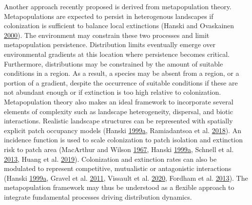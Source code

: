 \documentclass[12pt]{article}
\begin{document}
Another approach recently proposed is derived from metapopulation
theory. Metapopulations are expected to persist in heterogenous
landscapes if colonization is sufficient to balance local extinctions
(Hanski and Ovaskainen
\protect\hyperlink{ref-hanski_metapopulation_2000}{2000}). The
environment may constrain these two processes and limit metapopulation
persistence. Distribution limits eventually emerge over environmental
gradients at this location where persistence becomes critical.
Furthermore, distributions may be constrained by the amount of suitable
conditions in a region. As a result, a species may be absent from a
region, or a portion of a gradient, despite the occurrence of suitable
conditions if these are not abundant enough or if extinction is too high
relative to colonization. Metapopulation theory also makes an ideal
framework to incorporate several elements of complexity such as
landscape heterogeneity, dispersal, and biotic interactions. Realistic
landscape structures can be represented with spatially explicit patch
occupancy models (Hanski
\protect\hyperlink{ref-hanski_metapopulation_1999}{1999}\protect\hyperlink{ref-hanski_metapopulation_1999}{a},
Ramiadantsoa et al.
\protect\hyperlink{ref-ramiadantsoa_responses_2018}{2018}). An incidence
function is used to scale colonization to patch isolation and extinction
risk to patch area (MacArthur and Wilson
\protect\hyperlink{ref-macarthur_theory_1967}{1967}, Hanski
\protect\hyperlink{ref-hanski_metapopulation_1999}{1999}\protect\hyperlink{ref-hanski_metapopulation_1999}{a},
Schnell et al. \protect\hyperlink{ref-schnell_estimating_2013}{2013},
Huang et al. \protect\hyperlink{ref-huang_using_2019}{2019}).
Colonization and extinction rates can also be modulated to represent
competitive, mutualistic or antagonistic interactions (Hanski
\protect\hyperlink{ref-hanski_metapopulation_1999}{1999}\protect\hyperlink{ref-hanski_metapopulation_1999}{a},
Gravel et al. \protect\hyperlink{ref-gravel_trophic_2011}{2011},
Vissault et al. \protect\hyperlink{ref-vissault_slow_2020}{2020},
Fordham et al. \protect\hyperlink{ref-fordham_adapted_2013}{2013}). The
metapopulation framework may thus be understood as a flexible approach
to integrate fundamental processes driving distribution dynamics.
\end{document}
